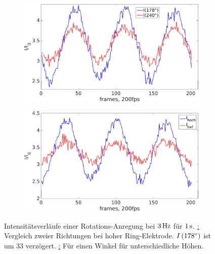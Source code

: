           \begin{figure}[!t]
            \centering
            \begin{subfigure}{0.49\textwidth}
              \centering
              \includegraphics[width=\textwidth,height=0.65\textwidth]{figs/auswertung/plasmaglw/intensrotathoch178u2402Hz1sek.png}
            \end{subfigure}
            \begin{subfigure}{0.49\textwidth}
              \centering
              \includegraphics[width=\textwidth,height=0.65\textwidth]{figs/auswertung/plasmaglw/intensrotathochutief1783Hz1sek.png}
            \end{subfigure}
            \caption{Intensitätsverläufe einer Rotations-Anregung bei $\unit[3]{Hz}$ für $\unit[1]{s}$. \underline{:} Vergleich zweier Richtungen bei hoher Ring-Elektrode. $I\left(178^\circ\right)$ ist um 33  verzögert. \underline{:} Für einen Winkel für unterschiedliche Höhen.}\label{img:intensrotathochutief}
          \end{figure}

